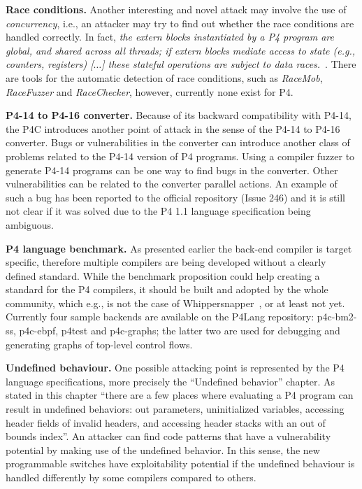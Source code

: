 \documentclass[10pt,sigconf]{acmart}
\begin{document}
\textbf{Race conditions.} Another interesting and novel attack may
involve the use of \emph{concurrency}, i.e.,
an attacker may try to find out whether the race
conditions are handled correctly.
In fact, \emph{the extern blocks instantiated by a P4 program
are global, and shared across all threads; 
if extern blocks mediate access to state (e.g.,
counters, registers) [$\ldots$] these
stateful operations are subject to data races.}~\cite{p4lang-spec}.
There are tools for the automatic detection of race conditions,
such as \emph{RaceMob},
\emph{RaceFuzzer} and \emph{RaceChecker}, 
however, currently none exist for P4.

\textbf{P4-14 to P4-16 converter.} Because of its backward compatibility with P4-14, 
the P4C introduces another point of
attack in the sense of the P4-14 to P4-16 converter. 
Bugs or vulnerabilities in the
converter can introduce another class of problems
 related to the P4-14 version of P4
programs.
Using a compiler fuzzer 
to generate P4-14 programs can be
one way to find bugs in the converter. Other vulnerabilities can be related to the
converter parallel actions. An example of such a bug has been reported to the official
repository (Issue 246) and it is still not
clear if it was solved due to the P4 1.1 language specification being ambiguous.

\textbf{P4 language benchmark.} As presented earlier the back-end compiler is target specific, 
therefore multiple compilers
are being developed without a clearly defined standard. 
While the benchmark proposition could help creating
a standard for the P4 compilers, it should be built and adopted by the whole community, which e.g., is not the case of Whippersnapper~\cite{whippersnapper}, 
or at least not yet. Currently
four sample backends are available on the P4Lang repository: p4c-bm2-ss, p4c-ebpf,
p4test and p4c-graphs; the latter two are used for debugging and generating graphs
of top-level control flows.

\textbf{Undefined behaviour.} One possible attacking point is represented by the P4 language specifications,
more precisely the ``Undefined behavior'' chapter. 
As stated in this chapter ``there
are a few places where evaluating a P4 program can result in undefined behaviors:
out parameters, uninitialized variables, accessing header fields of invalid headers, and
accessing header stacks with an out of bounds index''.
An attacker can find code patterns that have a vulnerability potential by making
use of the undefined behavior. In this sense, the new programmable switches have
exploitability potential if the undefined behaviour is handled differently by some
compilers compared to others.
\end{document}

